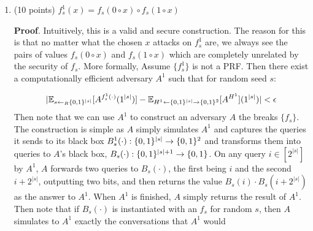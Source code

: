 \documentclass{article}
\begin{document}
\begin{enumerate}[,start=4]
\begin{enumerate}[noitemsep,topsep=\mdcompacttopsep,label=\alph*.]%

\item{}(10 points) $f^1_s(x)=f_s(0\circ x) \circ f_s(1\circ x)$ 

\begin{mdbmarginx}{1ex}{0pt}{1ex}{0pt}%
\noindent{}\textbf{Proof}.  Intuitively, this is a valid and secure construction. The reason for this is that no matter what the
chosen $x$ attacks on $f^1_s$ are, we always see the pairs of values $f_s(0 \circ x)$ and $f_s(1 \circ x)$
which are completely unrelated by the security of $f_s$. More formally,
Assume $\{f^1_s\}$ is not a PRF.  Then there exist a computationally efficient adversary $A^1$ such
that for random seed $s$:%
\end{mdbmarginx}%
\noindent\noindent\[%
|\E_{s \gets_R \zo^{|s|}} [A^{f^1_s(\cdot)}(1^{|s|})] - \E_{H^1 \gets \zo^{|s|} \to \zo^2}[A^{H^1}](1^{|s|}) | < \epsilon
\]%
Then note that we can use $A^1$ to construct an adversary $A$ the breaks $\{f_s\}$. The construction
is simple as $A$ simply simulates $A^1$ and captures the queries it sends to its black box 
$B^1_s(\cdot): \{0,1\}^{|s|} \to \{0,1\}^2$ and transforms them into queries to $A$'s black box, 
$B_s(\cdot):\{0,1\}^{|s| + 1} \to \{0,1\}$. On any query $i \in [2^{|s|}]$ by $A^1$, $A$ forwards two queries
to $B_s(\cdot)$, the first being $i$ and the second $i + 2^{|s|}$, outputting two bits, and then
returns the value $B_s(i) \cdot B_s(i + 2^{|s|})$ as the answer to $A^1$. When $A^1$ is finished,
$A$ simply returns the result of $A^1$. Then note that if $B_s(\cdot)$ is instantiated with 
an $f_s$ for random $s$, then $A$ simulates to $A^1$ exactly the conversations that $A^1$ would

\end{enumerate}
\end{enumerate}
\end{document}

